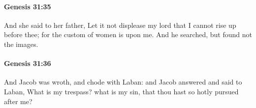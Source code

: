 		\paragraph{Genesis 31:35} %
			\label{GENESIS-31-35}

			And she said to her father, Let it not displease my lord that I cannot rise up before thee; for the custom of women is upon me. And he searched, but found not the images.


		\paragraph{Genesis 31:36} %
			\label{GENESIS-31-36}

			And Jacob was wroth, and chode with Laban: and Jacob answered and said to Laban, What is my trespass? what is my sin, that thou hast so hotly pursued after me?


